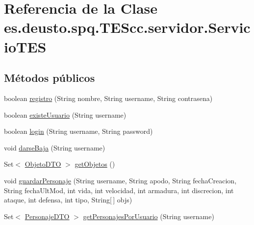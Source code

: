 \hypertarget{classes_1_1deusto_1_1spq_1_1_t_e_scc_1_1servidor_1_1_servicio_t_e_s}{\section{Referencia de la Clase es.\+deusto.\+spq.\+T\+E\+Scc.\+servidor.\+Servicio\+T\+E\+S}
\label{classes_1_1deusto_1_1spq_1_1_t_e_scc_1_1servidor_1_1_servicio_t_e_s}
}
\subsection*{Métodos públicos}
\begin{DoxyCompactItemize}
\item 
boolean \hyperlink{classes_1_1deusto_1_1spq_1_1_t_e_scc_1_1servidor_1_1_servicio_t_e_s_a65bc47e025d06304eb6109b2840ca844}{registro} (String nombre, String username, String contrasena)
\item 
boolean \hyperlink{classes_1_1deusto_1_1spq_1_1_t_e_scc_1_1servidor_1_1_servicio_t_e_s_aa3c3a2819e635e1bb90b04939ddc533a}{existe\+Usuario} (String username)
\item 
boolean \hyperlink{classes_1_1deusto_1_1spq_1_1_t_e_scc_1_1servidor_1_1_servicio_t_e_s_aa6c00621aa0f1c911bfb1a2f4640f2a2}{login} (String username, String password)
\item 
void \hyperlink{classes_1_1deusto_1_1spq_1_1_t_e_scc_1_1servidor_1_1_servicio_t_e_s_a3067da24c812bdb0d543582c9bdb7906}{darse\+Baja} (String username)
\item 
Set$<$ \hyperlink{classes_1_1deusto_1_1spq_1_1_t_e_scc_1_1dto_1_1_objeto_d_t_o}{Objeto\+D\+T\+O} $>$ \hyperlink{classes_1_1deusto_1_1spq_1_1_t_e_scc_1_1servidor_1_1_servicio_t_e_s_a8f8366789ad8d2fd8ab7249374a7c687}{get\+Objetos} ()
\item 
void \hyperlink{classes_1_1deusto_1_1spq_1_1_t_e_scc_1_1servidor_1_1_servicio_t_e_s_a6789b7aa39c757840a04b10555d222ec}{guardar\+Personaje} (String username, String apodo, String fecha\+Creacion, String fecha\+Ult\+Mod, int vida, int velocidad, int armadura, int discrecion, int ataque, int defensa, int tipo, String\mbox{[}$\,$\mbox{]} objs)
\item 
Set$<$ \hyperlink{classes_1_1deusto_1_1spq_1_1_t_e_scc_1_1dto_1_1_personaje_d_t_o}{Personaje\+D\+T\+O} $>$ \hyperlink{classes_1_1deusto_1_1spq_1_1_t_e_scc_1_1servidor_1_1_servicio_t_e_s_a0945ed0850fff7301eefe39733798204}{get\+Personajes\+Por\+Usuario} (String username)

\end{DoxyCompactItemize}
